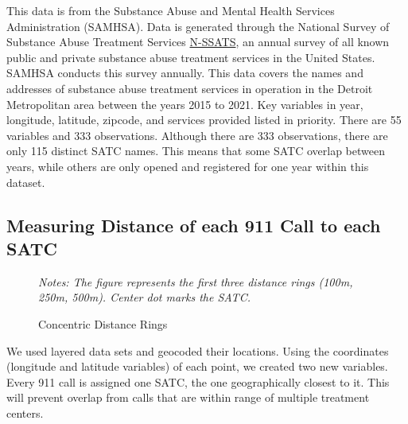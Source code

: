 \documentclass[12pt]{article}
\begin{document}
This data is from the Substance Abuse and Mental Health Services Administration (SAMHSA). Data is generated through the National Survey of Substance Abuse Treatment Services \href{https://www.samhsa.gov/data/data-we-collect/n-ssats-national-survey-substance-abuse-treatment-services}{N-SSATS}, an annual survey of all known public and private substance abuse treatment services in the United States. SAMHSA conducts this survey annually.  This data covers the names and addresses of substance abuse treatment services in operation in the Detroit Metropolitan area between the years 2015 to 2021. Key variables in year, longitude, latitude, zipcode, and services provided listed in priority. There are 55 variables and 333 observations. Although there are 333 observations, there are only 115 distinct SATC names. This means that some SATC overlap between years, while others are only opened and registered for one year within this dataset. 



\subsection{Measuring Distance of each 911 Call to each SATC}
 


\begin{figure} 
\caption{Concentric Distance Rings}
\small\textit{Notes: The figure represents the first three distance rings (100m, 250m, 500m). Center dot marks the SATC.}
\end{figure}

We used layered data sets and geocoded their locations. Using the coordinates (longitude and latitude variables) of each point, we created two new variables. Every 911 call is assigned one SATC, the one geographically closest to it. This will prevent overlap from calls that are within range of multiple treatment centers.
\end{document}

